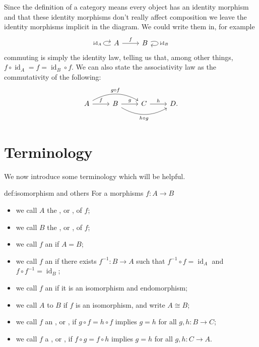 \documentclass[fleqn]{NotesClass}
\DeclareMathOperator{\id}{id}
\newcommand{\isomorphic}{\cong}
\begin{document}
    Since the definition of a category means every object has an identity morphism and that these identity morphisms don't really affect composition we leave the identity morphisms implicit in the diagram.
    We could write them in, for example
    \begin{equation}
        \begin{tikzcd}
           A \arrow[r, "f"] \arrow[loop left, "\id_A"] & B \arrow[loop right, "\id_B"]
        \end{tikzcd}
    \end{equation}
    commuting is simply the identity law, telling us that, among other things, \(f \circ \id_A = f = \id_B \circ f\).
    We can also state the associativity law as the commutativity of the following:
    \begin{equation}
        \begin{tikzcd}
            A \arrow[r, "f"] \arrow[rr, bend left, "g \circ f"] & B \arrow[r, "g"] \arrow[rr, bend right, "h \circ g"'] & C \arrow[r, "h"] & D.
        \end{tikzcd}
    \end{equation}
    
    \section{Terminology}
    We now introduce some terminology which will be helpful.
    \begin{dfn}{}{def:isomorphism and others}
        For a morphisms \(f \colon A \to B\)
        \begin{itemize}
            \item we call \(A\) the , or , of \(f\);
            \item we call \(B\) the , or , of \(f\);
            \item we call \(f\) an  if \(A = B\);
            \item we call \(f\) an  if there exists \(f^{-1} \colon B \to A\) such that \(f^{-1} \circ f = \id_A\) and \(f \circ f^{-1} = \id_{B}\);
            \item we call \(f\) an  if it is an isomorphism and endomorphism;
            \item we call \(A\)  to \(B\) if \(f\) is an isomorphism, and write \(A \isomorphic B\);
            \item we call \(f\) an , or , if \(g \circ f = h \circ f\) implies \(g = h\) for all \(g, h \colon B \to C\);
            \item we call \(f\) a , or , if \(f \circ g = f \circ h\) implies \(g = h\) for all \(g, h \colon C \to A\).
        \end{itemize}
    \end{dfn}
    
\end{document}
